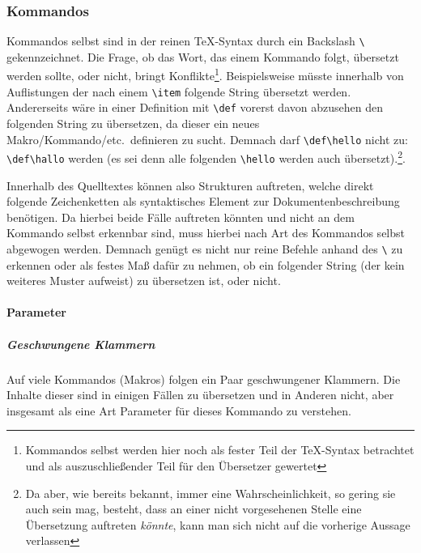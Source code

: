 \subsubsection{Kommandos}
Kommandos selbst sind in der reinen \TeX{}-Syntax durch ein Backslash \verb|\| gekennzeichnet. Die Frage, ob das Wort, das einem Kommando folgt, übersetzt werden sollte, oder nicht, bringt Konflikte\footnote{Kommandos selbst werden hier noch als fester Teil der \TeX{}-Syntax betrachtet und als auszuschließender Teil für den Übersetzer gewertet}. Beispielsweise müsste innerhalb von Auflistungen der nach einem \verb|\item| folgende String übersetzt werden. Andererseits wäre in einer Definition mit \verb|\def| vorerst davon abzusehen den folgenden String zu übersetzen, da dieser ein neues Makro/Kommando/etc.\ definieren zu sucht. Demnach darf \verb|\def\hello| nicht zu: \verb|\def\hallo| werden (es sei denn alle folgenden \verb|\hello| werden auch übersetzt).\footnote{Da aber, wie bereits bekannt, immer eine Wahrscheinlichkeit, so gering sie auch sein mag, besteht, dass an einer nicht vorgesehenen Stelle eine Übersetzung auftreten \textit{könnte}, kann man sich nicht auf die vorherige Aussage verlassen}.

Innerhalb des Quelltextes können also Strukturen auftreten, welche direkt folgende Zeichenketten als syntaktisches Element zur Dokumentenbeschreibung benötigen. Da hierbei beide Fälle auftreten könnten und nicht an dem Kommando selbst erkennbar sind, muss hierbei nach Art des Kommandos selbst abgewogen werden. Demnach genügt es nicht nur reine Befehle anhand des \verb|\| zu erkennen oder als festes Maß dafür zu nehmen, ob ein folgender String (der kein weiteres Muster aufweist) zu übersetzen ist, oder nicht.

\paragraph*{Parameter}
\subparagraph*{Geschwungene Klammern}
Auf viele Kommandos (Makros) folgen ein Paar geschwungener Klammern. Die Inhalte dieser sind in einigen Fällen zu übersetzen und in Anderen nicht, aber insgesamt als eine Art Parameter für dieses Kommando zu verstehen. 

